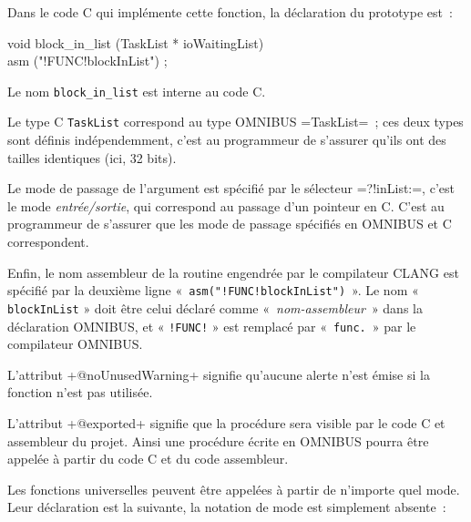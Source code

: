 Dans le code C qui implémente cette fonction, la déclaration du prototype est~:

\begin{SHELL}
void block\_in\_list (TaskList * ioWaitingList) \\
asm ("!FUNC!blockInList") ;
\end{SHELL}

Le nom \texttt{block\_in\_list} est interne au code C.

Le type C \texttt{TaskList} correspond au type OMNIBUS \omnibus=TaskList=~; ces deux types sont définis indépendemment, c'est au programmeur de s'assurer qu'ils ont des tailles identiques (ici, 32 bits).

Le mode de passage de l'argument est spécifié par le sélecteur \omnibus=?!inList:=, c'est le mode \emph{entrée/sortie}, qui correspond au passage d'un pointeur en C. C'est au programmeur de s'assurer que les mode de passage spécifiés en OMNIBUS et C correspondent.

Enfin, le nom assembleur de la routine engendrée par le compilateur CLANG est spécifié par la deuxième ligne «~\texttt{asm("!FUNC!blockInList")}~». Le nom « \texttt{blockInList} » doit être celui déclaré comme «~\emph{nom-assembleur}~» dans la déclaration OMNIBUS, et « \texttt{!FUNC!} » est remplacé par «~\texttt{func.}~» par le compilateur OMNIBUS.






L'attribut \omnibus+@noUnusedWarning+ signifie qu'aucune alerte n'est émise si la fonction n'est pas utilisée.




L'attribut \omnibus+@exported+ signifie que la procédure sera visible par le code C et assembleur du projet. Ainsi une procédure écrite en OMNIBUS pourra être appelée à partir du code C et du code assembleur.







Les fonctions universelles peuvent être appelées à partir de n'importe quel mode. Leur déclaration est la suivante, la notation de mode est simplement absente~:

